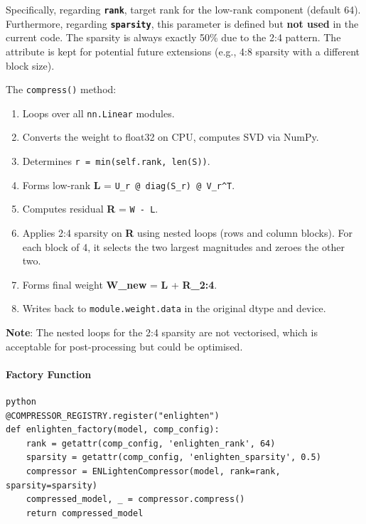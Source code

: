 Specifically, regarding \textbf{\texttt{rank}}, target rank for the low-rank component (default 64). Furthermore, regarding \textbf{\texttt{sparsity}}, this parameter is defined but \textbf{not used} in the current code. The sparsity is always exactly 50\% due to the 2:4 pattern. The attribute is kept for potential future extensions (e.g., 4:8 sparsity with a different block size).


The \texttt{compress()} method:

\begin{enumerate}
\item Loops over all \texttt{nn.Linear} modules.
\item Converts the weight to float32 on CPU, computes SVD via NumPy.
\item Determines \texttt{r = min(self.rank, len(S))}.
\item Forms low-rank \textbf{L} = \texttt{U\_r @ diag(S\_r) @ V\_r\textasciicircum{}T}.
\item Computes residual \textbf{R} = \texttt{W - L}.
\item Applies 2:4 sparsity on \textbf{R} using nested loops (rows and column blocks). For each block of 4, it selects the two largest magnitudes and zeroes the other two.
\item Forms final weight \textbf{W\_new} = \textbf{L} + \textbf{R\_2:4}.
\item Writes back to \texttt{module.weight.data} in the original dtype and device.

\end{enumerate}
\textbf{Note}: The nested loops for the 2:4 sparsity are not vectorised, which is acceptable for post-processing but could be optimised.

\paragraph{Factory Function}

\vspace{0.5em}
\begin{mdframed}[backgroundcolor=codebg, linecolor=codeframe, linewidth=1pt, roundcorner=4pt, innerleftmargin=2pt, innerrightmargin=5pt, innertopmargin=5pt, innerbottommargin=5pt]
\begin{lstlisting}
python
@COMPRESSOR_REGISTRY.register("enlighten")
def enlighten_factory(model, comp_config):
    rank = getattr(comp_config, 'enlighten_rank', 64)
    sparsity = getattr(comp_config, 'enlighten_sparsity', 0.5)
    compressor = ENLightenCompressor(model, rank=rank, sparsity=sparsity)
    compressed_model, _ = compressor.compress()
    return compressed_model
\end{lstlisting}
\end{mdframed}
\vspace{0.5em}

